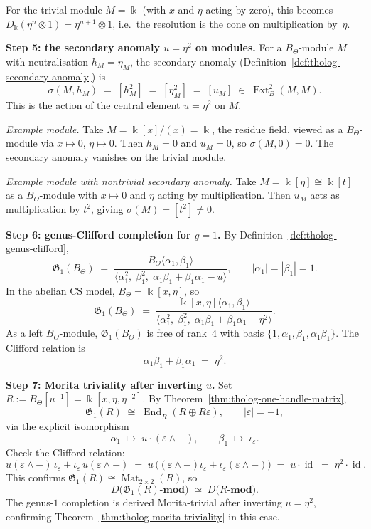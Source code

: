 \begin{example}
For the trivial module $M=\Bbbk$ (with $x$ and $\eta$ acting by
zero), this becomes $D_\Bbbk(\eta^n\otimes 1)=\eta^{n+1}\otimes 1$,
i.e.\ the resolution is the cone on multiplication by~$\eta$.

\medskip
\noindent\textbf{Step 5: the secondary anomaly $u=\eta^2$ on modules.}
For a $B_\Theta$-module $M$ with neutralisation $h_M=\eta_M$,
the secondary anomaly (Definition~\ref{def:tholog-secondary-anomaly})
is
\[
\sigma(M,h_M) \;=\; [h_M^2] \;=\; [\eta_M^2] \;=\; [u_M]
\;\in\; \operatorname{Ext}^2_B(M,M).
\]
This is the action of the central element $u=\eta^2$ on $M$.

\emph{Example module.}
Take $M=\Bbbk[x]/(x)=\Bbbk$, the residue field, viewed as a
$B_\Theta$-module via $x\mapsto 0$, $\eta\mapsto 0$. Then
$h_M=0$ and $u_M=0$, so $\sigma(M,0)=0$. The secondary anomaly
vanishes on the trivial module.

\emph{Example module with nontrivial secondary anomaly.}
Take $M=\Bbbk[\eta]\cong\Bbbk[t]$ as a $B_\Theta$-module with
$x\mapsto 0$ and $\eta$ acting by multiplication. Then $u_M$
acts as multiplication by $t^2$, giving $\sigma(M)=[t^2]\neq 0$.

\medskip
\noindent\textbf{Step 6: genus-Clifford completion for $g=1$.}
By Definition~\ref{def:tholog-genus-clifford},
\[
\mathfrak{G}_1(B_\Theta)
\;=\;
\frac{B_\Theta\langle\alpha_1,\beta_1\rangle}
{\langle\alpha_1^2,\;\beta_1^2,\;
\alpha_1\beta_1+\beta_1\alpha_1-u\rangle},
\qquad |\alpha_1|=|\beta_1|=1.
\]
In the abelian CS model, $B_\Theta=\Bbbk[x,\eta]$, so
\[
\mathfrak{G}_1(B_\Theta)
\;=\;
\frac{\Bbbk[x,\eta]\langle\alpha_1,\beta_1\rangle}
{\langle\alpha_1^2,\;\beta_1^2,\;
\alpha_1\beta_1+\beta_1\alpha_1-\eta^2\rangle}.
\]
As a left $B_\Theta$-module, $\mathfrak{G}_1(B_\Theta)$ is free of
rank~$4$ with basis $\{1,\alpha_1,\beta_1,\alpha_1\beta_1\}$.
The Clifford relation is
\[
\alpha_1\beta_1+\beta_1\alpha_1 \;=\; \eta^2.
\]

\medskip
\noindent\textbf{Step 7: Morita triviality after inverting $u$.}
Set $R:=B_\Theta[u^{-1}]=\Bbbk[x,\eta,\eta^{-2}]$.
By Theorem~\ref{thm:tholog-one-handle-matrix},
\[
\mathfrak{G}_1(R)
\;\cong\;
\underline{\operatorname{End}}_R(R\oplus R\varepsilon),
\qquad |\varepsilon|=-1,
\]
via the explicit isomorphism
\[
\alpha_1\;\longmapsto\;u\cdot(\varepsilon\wedge -),
\qquad
\beta_1\;\longmapsto\;\iota_\varepsilon.
\]
Check the Clifford relation:
\[
u(\varepsilon\wedge -)\,\iota_\varepsilon
+\iota_\varepsilon\,u(\varepsilon\wedge -)
\;=\;
u\,\bigl((\varepsilon\wedge-)\iota_\varepsilon
+\iota_\varepsilon(\varepsilon\wedge-)\bigr)
\;=\;u\cdot\operatorname{id}
\;=\;\eta^2\cdot\operatorname{id}.
\]
This confirms $\mathfrak{G}_1(R)\cong\operatorname{Mat}_{2\times 2}(R)$,
so
\[
D\bigl(\mathfrak{G}_1(R)\text{-}\mathbf{mod}\bigr)
\;\simeq\;
D\bigl(R\text{-}\mathbf{mod}\bigr).
\]
The genus-$1$ completion is derived Morita-trivial after inverting
$u=\eta^2$, confirming
Theorem~\ref{thm:tholog-morita-triviality} in this case.


\end{example}
